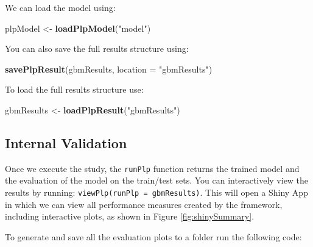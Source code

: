 \documentclass[11pt]{book}
\newenvironment{Shaded}{\begin{snugshade}}{\end{snugshade}}
\newcommand{\DataTypeTok}[1]{\textcolor[rgb]{0.13,0.29,0.53}{#1}}
\newcommand{\KeywordTok}[1]{\textcolor[rgb]{0.13,0.29,0.53}{\textbf{#1}}}
\newcommand{\NormalTok}[1]{#1}
\newcommand{\OperatorTok}[1]{\textcolor[rgb]{0.81,0.36,0.00}{\textbf{#1}}}
\newcommand{\StringTok}[1]{\textcolor[rgb]{0.31,0.60,0.02}{#1}}
\theoremstyle{definition}
\theoremstyle{definition}
\theoremstyle{definition}
\theoremstyle{remark}
\begin{document}
\begin{Shaded}
\end{Shaded}

We can load the model using:

\begin{Shaded}
\begin{Highlighting}[]
\NormalTok{plpModel <-}\StringTok{ }\KeywordTok{loadPlpModel}\NormalTok{(}\StringTok{"model"}\NormalTok{)}
\end{Highlighting}
\end{Shaded}

You can also save the full results structure using:

\begin{Shaded}
\begin{Highlighting}[]
\KeywordTok{savePlpResult}\NormalTok{(gbmResults, }\DataTypeTok{location =} \StringTok{"gbmResults"}\NormalTok{)}
\end{Highlighting}
\end{Shaded}

To load the full results structure use:

\begin{Shaded}
\begin{Highlighting}[]
\NormalTok{gbmResults <-}\StringTok{ }\KeywordTok{loadPlpResult}\NormalTok{(}\StringTok{"gbmResults"}\NormalTok{)}
\end{Highlighting}
\end{Shaded}

\hypertarget{internal-validation}{%
\subsection{Internal Validation}\label{internal-validation}}

Once we execute the study, the \texttt{runPlp} function returns the trained model and the evaluation of the model on the train/test sets. You can interactively view the results by running: \texttt{viewPlp(runPlp\ =\ gbmResults)}. This will open a Shiny App in which we can view all performance measures created by the framework, including interactive plots, as shown in Figure \ref{fig:shinySummary}.

To generate and save all the evaluation plots to a folder run the following code:
\end{document}
